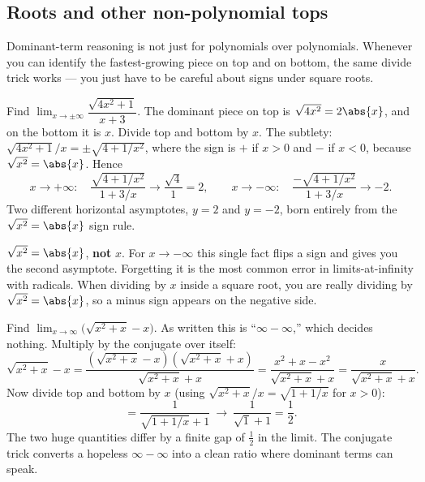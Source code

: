 \subsection{Roots and other non-polynomial tops}

Dominant-term reasoning is not just for polynomials over polynomials. Whenever
you can identify the fastest-growing piece on top and on bottom, the same divide
trick works --- you just have to be careful about signs under square roots.

\begin{example}
\label{ch09:ex-sqrt}
Find $\lim_{x\to\pm\infty}\dfrac{\sqrt{4x^2+1}}{x+3}$.
The dominant piece on top is $\sqrt{4x^2}=2\abs{x}$, and on the bottom it is $x$.
Divide top and bottom by $x$. The subtlety: $\sqrt{4x^2+1}/x = \pm\sqrt{4+1/x^2}$,
where the sign is $+$ if $x>0$ and $-$ if $x<0$, because $\sqrt{x^2}=\abs{x}$.
Hence
\[
  x\to+\infty:\quad \frac{\sqrt{4+1/x^2}}{1+3/x}\to\frac{\sqrt 4}{1}=2,
  \qquad
  x\to-\infty:\quad \frac{-\sqrt{4+1/x^2}}{1+3/x}\to -2 .
\]
Two different horizontal asymptotes, $y=2$ and $y=-2$, born entirely from the
$\sqrt{x^2}=\abs{x}$ sign rule.
\end{example}

\begin{trapbox}
$\sqrt{x^2}=\abs{x}$, \textbf{not} $x$. For $x\to-\infty$ this single fact flips
a sign and gives you the second asymptote. Forgetting it is the most common
error in limits-at-infinity with radicals. When dividing by $x$ inside a square
root, you are really dividing by $\sqrt{x^2}=\abs{x}$, so a minus sign appears on
the negative side.
\end{trapbox}

\begin{example}
\label{ch09:ex-diff-roots}
Find $\lim_{x\to\infty}\bigl(\sqrt{x^2+x}-x\bigr)$. As written this is
``$\infty-\infty$,'' which decides nothing. Multiply by the conjugate over
itself:
\[
\sqrt{x^2+x}-x
= \frac{(\sqrt{x^2+x}-x)(\sqrt{x^2+x}+x)}{\sqrt{x^2+x}+x}
= \frac{x^2+x-x^2}{\sqrt{x^2+x}+x}
= \frac{x}{\sqrt{x^2+x}+x}.
\]
Now divide top and bottom by $x$ (using $\sqrt{x^2+x}/x=\sqrt{1+1/x}$ for $x>0$):
\[
= \frac{1}{\sqrt{1+1/x}+1}\ \longrightarrow\ \frac{1}{\sqrt 1 + 1}=\frac12 .
\]
The two huge quantities differ by a finite gap of $\tfrac12$ in the limit. The
conjugate trick converts a hopeless $\infty-\infty$ into a clean ratio where
dominant terms can speak.
\end{example}

